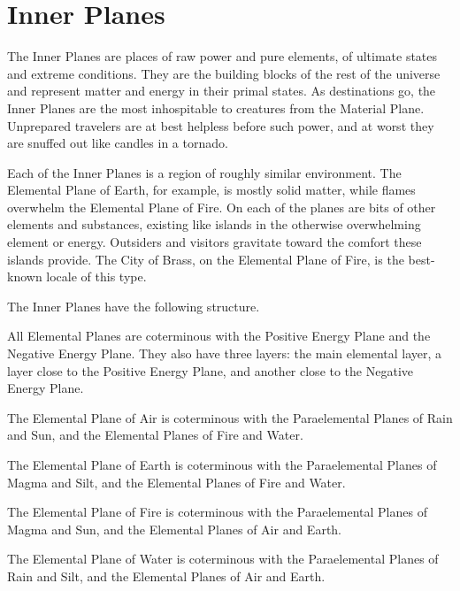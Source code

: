 \section{Inner Planes}
The Inner Planes are places of raw power and pure elements, of ultimate states and extreme conditions. They are the building blocks of the rest of the universe and represent matter and energy in their primal states. As destinations go, the Inner Planes are the most inhospitable to creatures from the Material Plane. Unprepared travelers are at best helpless before such power, and at worst they are snuffed out like candles in a tornado.

Each of the Inner Planes is a region of roughly similar environment. The Elemental Plane of Earth, for example, is mostly solid matter, while flames overwhelm the Elemental Plane of Fire. On each of the planes are bits of other elements and substances, existing like islands in the otherwise overwhelming element or energy. Outsiders and visitors gravitate toward the comfort these islands provide. The City of Brass, on the Elemental Plane of Fire, is the best-known locale of this type.

The Inner Planes have the following structure.
\begin{itemize*}
\item All Elemental Planes are coterminous with the Positive Energy Plane and the Negative Energy Plane. They also have three layers: the main elemental layer, a layer close to the Positive Energy Plane, and another close to the Negative Energy Plane.
\item The Elemental Plane of Air is coterminous with the Paraelemental Planes of Rain and Sun, and the Elemental Planes of Fire and Water.
\item The Elemental Plane of Earth is coterminous with the Paraelemental Planes of Magma and Silt, and the Elemental Planes of Fire and Water.
\item The Elemental Plane of Fire is coterminous with the Paraelemental Planes of Magma and Sun, and the Elemental Planes of Air and Earth.
\item The Elemental Plane of Water is coterminous with the Paraelemental Planes of Rain and Silt, and the Elemental Planes of Air and Earth.
\end{itemize*}


